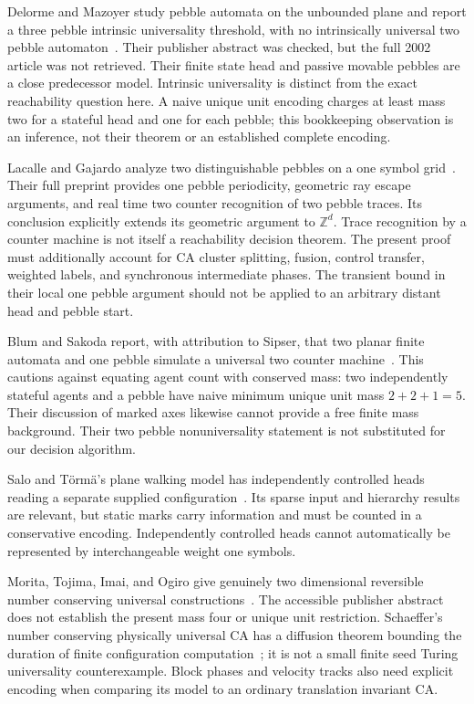 \documentclass[11pt,letterpaper]{article}
\numberwithin{equation}{section}
\theoremstyle{definition}
\theoremstyle{remark}
\newcommand{\Z}{\mathbb Z}
\begin{document}
Delorme and Mazoyer study pebble automata on the unbounded plane and report a three pebble intrinsic universality threshold, with no intrinsically universal two pebble automaton~\cite{delorme2002}. Their publisher abstract was checked, but the full 2002 article was not retrieved. Their finite state head and passive movable pebbles are a close predecessor model. Intrinsic universality is distinct from the exact reachability question here. A naive unique unit encoding charges at least mass two for a stateful head and one for each pebble; this bookkeeping observation is an inference, not their theorem or an established complete encoding.

Lacalle and Gajardo analyze two distinguishable pebbles on a one symbol grid~\cite{lacalle2014}. Their full preprint provides one pebble periodicity, geometric ray escape arguments, and real time two counter recognition of two pebble traces. Its conclusion explicitly extends its geometric argument to $\Z^d$. Trace recognition by a counter machine is not itself a reachability decision theorem. The present proof must additionally account for CA cluster splitting, fusion, control transfer, weighted labels, and synchronous intermediate phases. The transient bound in their local one pebble argument should not be applied to an arbitrary distant head and pebble start.

Blum and Sakoda report, with attribution to Sipser, that two planar finite automata and one pebble simulate a universal two counter machine~\cite{blum1977}. This cautions against equating agent count with conserved mass: two independently stateful agents and a pebble have naive minimum unique unit mass $2+2+1=5$. Their discussion of marked axes likewise cannot provide a free finite mass background. Their two pebble nonuniversality statement is not substituted for our decision algorithm.

Salo and T\"orm\"a's plane walking model has independently controlled heads reading a separate supplied configuration~\cite{salo2014}. Its sparse input and hierarchy results are relevant, but static marks carry information and must be counted in a conservative encoding. Independently controlled heads cannot automatically be represented by interchangeable weight one symbols.

Morita, Tojima, Imai, and Ogiro give genuinely two dimensional reversible number conserving universal constructions~\cite{morita2002}. The accessible publisher abstract does not establish the present mass four or unique unit restriction. Schaeffer's number conserving physically universal CA has a diffusion theorem bounding the duration of finite configuration computation~\cite{schaeffer2014}; it is not a small finite seed Turing universality counterexample. Block phases and velocity tracks also need explicit encoding when comparing its model to an ordinary translation invariant CA.
\end{document}
